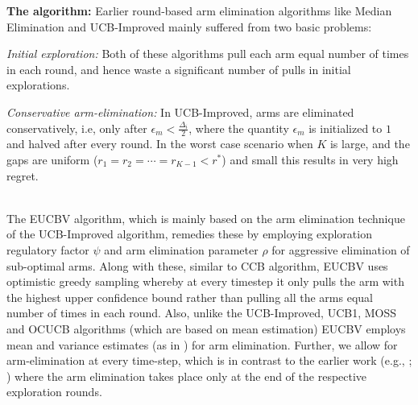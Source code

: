\documentclass[MS,synopsis]{iitmdiss}
\begin{document}
\textbf{The algorithm:} Earlier round-based arm elimination algorithms like Median Elimination \citep{even2006action} and UCB-Improved mainly suffered from two basic problems: \\
\begin{inparaenum}[\bfseries(i)]
\item \textit{Initial exploration:} Both of these algorithms pull each arm equal number of times in each round, and hence waste a significant number of pulls in initial explorations. \\
\item \textit{Conservative arm-elimination:} In UCB-Improved, arms are eliminated conservatively, i.e, only after $\epsilon_{m}<\frac{\Delta_{i}}{2}$, 
where the quantity $\epsilon_{m}$ is initialized to $1$ and halved after every round. In the worst case scenario when $K$ is large, and the gaps are uniform  ($r_{1}=r_{2}=\cdots=r_{K-1}<r^{*}$) and small this results in very high regret.\\
\end{inparaenum}
\\
	The EUCBV algorithm, which is mainly based on the arm elimination technique of the UCB-Improved algorithm,  remedies these by employing exploration regulatory factor $\psi$ and arm elimination parameter $\rho$ for aggressive elimination of sub-optimal arms. Along with these, similar to CCB \citep{liu2016modification} algorithm, EUCBV uses optimistic greedy sampling whereby at every timestep it only pulls the arm with the highest upper confidence bound rather than pulling all the arms equal number of times in each round. Also, unlike the UCB-Improved, UCB1, MOSS and OCUCB algorithms (which are based on mean estimation) EUCBV employs mean and variance estimates (as in \citet{audibert2009exploration}) for arm elimination. Further, we allow for arm-elimination at every time-step, which is in contrast to the earlier work (e.g., \citet{auer2010ucb}; \citet{even2006action}) where the arm elimination takes place only at the end of the respective exploration rounds. 
	
%	
\end{document}
